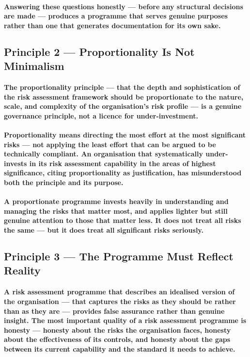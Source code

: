 \paragraph{Answering these questions honestly — before any structural decisions are made — produces a programme that serves genuine purposes rather than one that generates documentation for its own sake.}

\subsection{Principle 2 — Proportionality Is Not Minimalism}
\paragraph{The proportionality principle — that the depth and sophistication of the risk assessment framework should be proportionate to the nature, scale, and complexity of the organisation's risk profile — is a genuine governance principle, not a licence for under-investment.}
\paragraph{Proportionality means directing the most effort at the most significant risks — not applying the least effort that can be argued to be technically compliant. An organisation that systematically under-invests in its risk assessment capability in the areas of highest significance, citing proportionality as justification, has misunderstood both the principle and its purpose.}
\paragraph{A proportionate programme invests heavily in understanding and managing the risks that matter most, and applies lighter but still genuine attention to those that matter less. It does not treat all risks the same — but it does treat all significant risks seriously.}

\subsection{Principle 3 — The Programme Must Reflect Reality}
\paragraph{A risk assessment programme that describes an idealised version of the organisation — that captures the risks as they should be rather than as they are — provides false assurance rather than genuine insight. The most important quality of a risk assessment programme is honesty — honesty about the risks the organisation faces, honesty about the effectiveness of its controls, and honesty about the gaps between its current capability and the standard it needs to achieve.}
